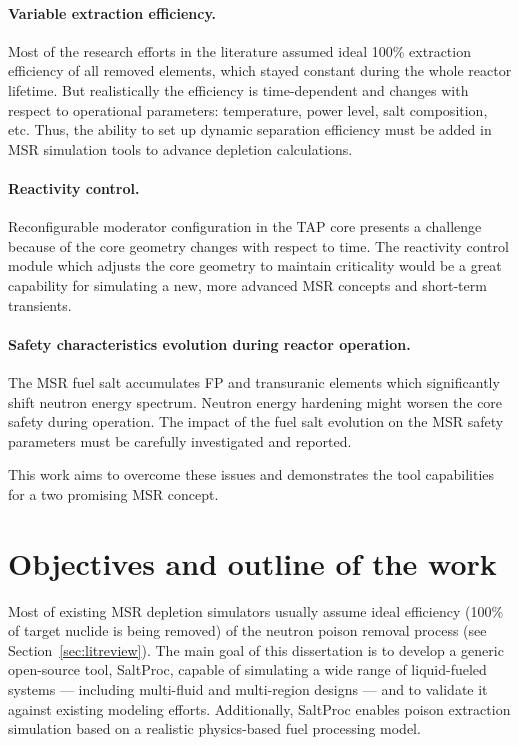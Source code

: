 \paragraph{Variable extraction efficiency.} Most of the research efforts in 
the literature assumed ideal 100\% extraction efficiency of all removed 
elements, which stayed 
constant during the whole reactor lifetime. But realistically the efficiency 
is time-dependent and changes with respect to operational parameters: 
temperature, power level, salt composition, etc. Thus, the ability to set up 
dynamic separation efficiency must be added in \gls{MSR} simulation tools to 
advance depletion calculations.
\paragraph{Reactivity control.} Reconfigurable moderator configuration in the 
\gls{TAP} core presents a challenge because of the core geometry changes with 
respect to time. The reactivity control module which adjusts the core geometry 
to maintain criticality would be a great capability for simulating a new, more 
advanced \gls{MSR} concepts and short-term transients.
\paragraph{Safety characteristics evolution during reactor operation.} The 
\gls{MSR} fuel salt  accumulates \gls{FP} and transuranic elements which 
significantly shift neutron energy spectrum. Neutron energy hardening might 
worsen the core safety during operation. The impact of the fuel salt evolution 
on the \gls{MSR} safety parameters must be carefully investigated and reported.

This work aims to overcome these issues and demonstrates the tool capabilities 
for a two promising \gls{MSR} concept.


\section{Objectives and outline of the work}
Most of existing \gls{MSR} depletion simulators usually assume ideal  
efficiency (100\% of target nuclide is being removed) of the neutron poison 
removal process (see Section~\ref{sec:litreview}). The main goal of this 
dissertation is to develop a generic open-source tool, SaltProc, capable of 
simulating a wide range of liquid-fueled systems --- including multi-fluid and 
multi-region designs --- and to validate it against existing modeling efforts. 
Additionally, SaltProc enables poison extraction simulation based on a  
realistic physics-based fuel processing model. 

